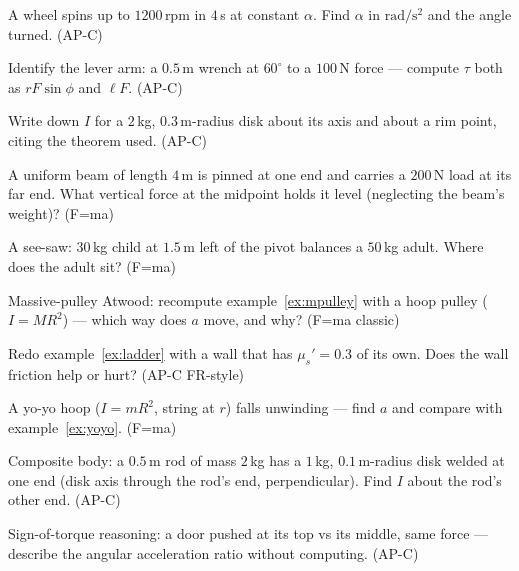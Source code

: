 \begin{exercise}[easy]
A wheel spins up to $1200$\,rpm in $4$\,s at constant $\alpha$. Find
$\alpha$ in $\mathrm{rad/s^{2}}$ and the angle turned. (AP-C)
\end{exercise}
\begin{exercise}[easy]
Identify the lever arm: a $0.5$\,m wrench at $60^{\circ}$ to a $100$\,N
force --- compute $\tau$ both as $rF\sin\phi$ and $\ell F$. (AP-C)
\end{exercise}
\begin{exercise}[easy]
Write down $I$ for a $2$\,kg, $0.3$\,m-radius disk about its axis and
about a rim point, citing the theorem used. (AP-C)
\end{exercise}
\begin{exercise}[easy]
A uniform beam of length $4$\,m is pinned at one end and carries a
$200$\,N load at its far end. What vertical force at the midpoint holds
it level (neglecting the beam's weight)? (F=ma)
\end{exercise}
\begin{exercise}[easy]
A see-saw: $30$\,kg child at $1.5$\,m left of the pivot balances a
$50$\,kg adult. Where does the adult sit? (F=ma)
\end{exercise}
\begin{exercise}[medium]
Massive-pulley Atwood: recompute example~\ref{ex:mpulley} with a hoop
pulley ($I=MR^{2}$) --- which way does $a$ move, and why? (F=ma classic)
\end{exercise}
\begin{exercise}[medium]
Redo example~\ref{ex:ladder} with a wall that has $\mu_s'=0.3$ of its
own. Does the wall friction help or hurt? (AP-C FR-style)
\end{exercise}
\begin{exercise}[medium]
A yo-yo hoop ($I=mR^{2}$, string at $r$) falls unwinding --- find $a$
and compare with example~\ref{ex:yoyo}. (F=ma)
\end{exercise}
\begin{exercise}[medium]
Composite body: a $0.5$\,m rod of mass $2$\,kg has a $1$\,kg,
$0.1$\,m-radius disk welded at one end (disk axis through the rod's end,
perpendicular). Find $I$ about the rod's other end. (AP-C)
\end{exercise}
\begin{exercise}[medium]
Sign-of-torque reasoning: a door pushed at its top vs its middle, same
force --- describe the angular acceleration ratio without computing.
(AP-C)
\end{exercise}

